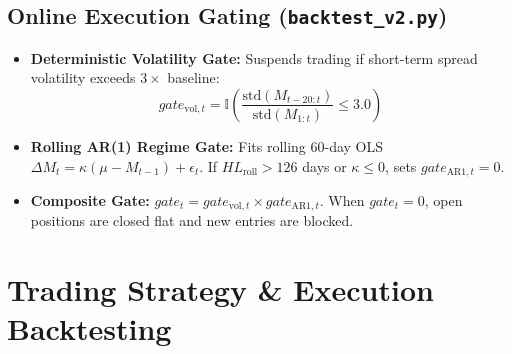\documentclass[11pt, a4paper]{article}
\begin{document}
\subsection{Online Execution Gating (\texttt{backtest\_v2.py})}
\begin{itemize}
    \item \textbf{Deterministic Volatility Gate:} Suspends trading if short-term spread volatility exceeds $3\times$ baseline:
    \begin{equation}
        gate_{\text{vol}, t} = \mathbb{I}\left( \frac{\text{std}(M_{t-20:t})}{\text{std}(M_{1:t})} \le 3.0 \right)
    \end{equation}
    \item \textbf{Rolling AR(1) Regime Gate:} Fits rolling 60-day OLS $\Delta M_t = \kappa (\mu - M_{t-1}) + \epsilon_t$. If $HL_{\text{roll}} > 126$ days or $\kappa \le 0$, sets $gate_{\text{AR1}, t} = 0$.
    \item \textbf{Composite Gate:} $gate_t = gate_{\text{vol}, t} \times gate_{\text{AR1}, t}$. When $gate_t = 0$, open positions are closed flat and new entries are blocked.
\end{itemize}

\section{Trading Strategy \& Execution Backtesting}
\end{document}
